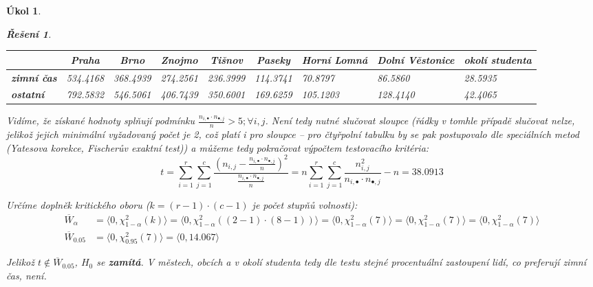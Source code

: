 \documentclass[11pt, a4paper]{article}
\theoremstyle{result}
\newtheorem*{result}{Řešení}
\newtheorem{task}{Úkol}
\begin{document}
\begin{task}
\begin{enumerate}[a)]
\begin{result}
             \begin{center}
                \begin{tabular}{ |l|c|c|c|c|c|M{1.5cm}|M{1.9cm}|M{1.8cm}| }
                    \hline
                    & \textbf{Praha} & \textbf{Brno} & \textbf{Znojmo} & \textbf{Tišnov} & \textbf{Paseky} & \textbf{Horní Lomná} & \textbf{Dolní Věstonice} & \textbf{okolí studenta} \\
                    \hline
                    \textbf{zimní čas} & 534.4168 & 368.4939 & 274.2561 & 236.3999 & 114.3741 & 70.8797 & 86.5860 & 28.5935 \\
                    \hline
                    \textbf{ostatní} & 792.5832 & 546.5061 & 406.7439 & 350.6001 & 169.6259 & 105.1203 & 128.4140 & 42.4065 \\
                    \hline
                \end{tabular}
            \end{center}

            Vidíme, že získané hodnoty splňují podmínku $\frac{n_{i, \bullet} \cdot n_{\bullet, j}}{n} > 5; \forall i,j$. Není tedy nutné slučovat sloupce (řádky v tomhle případě slučovat nelze, jelikož jejich minimální vyžadovaný počet je 2, což platí i pro sloupce -- pro čtyřpolní tabulku by se pak postupovalo dle speciálních metod (Yatesova korekce, Fischerův exaktní test)) a můžeme tedy pokračovat výpočtem testovacího kritéria:
            $$t = \sum_{i=1}^{r} \sum_{j=1}^{c} \frac{(n_{i, j} - \frac{n_{i, \bullet} \cdot n_{\bullet, j}}{n})^2}{\frac{n_{i, \bullet} \cdot n_{\bullet, j}}{n}} = n \sum_{i=1}^{r} \sum_{j=1}^{c} \frac{n_{i, j}^2}{n_{i, \bullet} \cdot n_{\bullet, j}} - n = 38.0913$$

            Určíme doplněk kritického oboru ($k = (r - 1)\cdot(c - 1)$ je počet stupňů volnosti):
            \begin{align*}
                \overline{W}_\alpha &= \langle 0, \chi_{1 - \alpha}^2(k) \rangle = \langle 0, \chi_{1 - \alpha}^2((2 - 1)\cdot(8 - 1)) \rangle = \langle 0, \chi_{1 - \alpha}^2(7) \rangle = \langle 0, \chi_{1 - \alpha}^2(7) \rangle = \langle 0, \chi_{1 - \alpha}^2(7) \rangle \\
                \overline{W}_{0.05} &= \langle 0, \chi_{0.95}^2(7) \rangle = \langle 0, 14.067 \rangle
            \end{align*}

            Jelikož $t \notin \overline{W}_{0.05}$, $H_0$ se \textbf{zamítá}. V městech, obcích a v okolí studenta tedy dle testu stejné procentuální zastoupení lidí, co preferují zimní čas, není.
        \end{result}
        

\end{enumerate}
\end{task}
\end{document}
